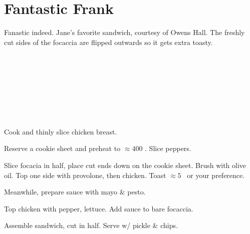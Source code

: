 \section{Fantastic Frank}

\begin{recipestats}[
        servings=1,
        preptime=10 \minute,
        bakingtime=10 \minute,
        source=Mike \& Jane,
        original=\citefield{vtechDiningFantasticFrank}{shorttitle}~\cite{vtechDiningFantasticFrank},
    ]
\end{recipestats}

\begin{recipeabstract}
    Fanastic indeed.
    Jane's favorite sandwich, courtesy of Owens Hall.
    The freshly cut sides of the focaccia are flipped outwards so it gets extra toasty.
\end{recipeabstract}

\begin{ingredientcolumns}
    \begin{ingredientblock}
        \\
        \\
        \\
    \end{ingredientblock}
    \begin{ingredientblock}
        \\
        \\
        \\
    \end{ingredientblock}
\end{ingredientcolumns}

\begin{preparation}
\item Cook and thinly slice chicken breast.

\item Reserve a cookie sheet and preheat to $\approx 400$ \Fahrenheit.
    Slice peppers.

\item Slice focacia in half, place cut ends down on the cookie sheet.
    Brush with olive oil.
    Top one side with provolone, then chicken.
    Toast $\approx 5$ \minute~or your preference.

\item Meanwhile, prepare sauce with mayo \& pesto.

\item Top chicken with pepper, lettuce.
    Add sauce to bare focaccia.

\item Assemble sandwich, cut in half.
    Serve w/ pickle \& chips.
\end{preparation}

\recipeend%
